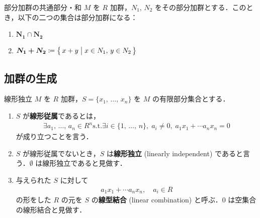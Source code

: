 \documentclass[geometry_main]{subfiles}
\begin{document}
\begin{mydef}[label=def:sum-module]{部分加群の共通部分・和}
	$M$ を $R$ 加群，$N_1,\, N_2$ をその部分加群とする．このとき，以下の二つの集合は部分加群になる：
	\begin{enumerate}
		\item $\bm{N_1 \cap N_2}$
		\item $\bm{N_1 + N_2} \coloneqq \bigl\{\, x+y \bigm| x \in N_1,\, y\in N_2 \,\bigr\} $
	\end{enumerate}
\end{mydef}

\subsection{加群の生成}

\begin{mydef}[label=def:linear]{線形独立}
	$M$ を $R$ 加群，$S = \{x_1,\, \dots ,\, x_n\}$ を $M$ の有限部分集合とする．
	\begin{enumerate}
		\item $S$ が\textbf{線形従属}であるとは，
		\begin{align}
			\exists a_1,\, \dots ,\, a_n \in R^n \mathrel{}\mathrm{s.t.}\mathrel{} \exists i \in \{1,\, \dots ,\, n\},\; a_i \neq 0,\; a_1 x_1 + \cdots a_n x_n = 0
		\end{align}
		が成り立つことを言う．
		\item $S$ が線形従属でないとき，$S$ は\textbf{線形独立} (linearly independent) であると言う．$\emptyset$ は線形独立であると見做す．
		\item 与えられた $S$ に対して
		\begin{align}
			a_1 x_1 +\cdots a_n x_n,\quad a_i \in R
		\end{align}
		の形をした $R$ の元を $S$ の\textbf{線型結合} (linear combination) と呼ぶ．$0$ は空集合の線形結合と見做す．
	\end{enumerate}
\end{mydef}
\end{document}
